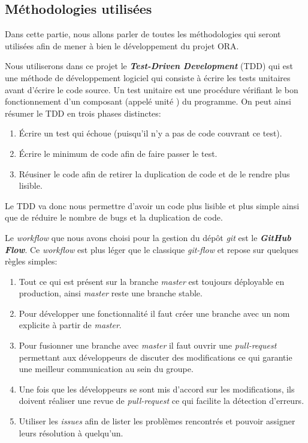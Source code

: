 \documentclass[11pt, a4paper]{specifications}
\begin{document}
    \subsection{Méthodologies utilisées}
Dans cette partie, nous allons parler de toutes les méthodologies qui seront utilisées afin de mener à bien le développement du projet ORA.\newline

Nous utiliserons dans ce projet le \textbf{\textit{Test-Driven Development}} (TDD) qui est une méthode de développement logiciel qui consiste à écrire les tests unitaires avant d'écrire le code source. Un test unitaire est une procédure vérifiant le bon fonctionnement d'un composant (appelé \og unité \fg) du programme.
On peut ainsi résumer le TDD en trois phases distinctes:
\begin{enumerate}
  \item Écrire un test qui échoue (puisqu'il n'y a pas de code couvrant ce test).
  \item Écrire le minimum de code afin de faire passer le test.
  \item Réusiner le code afin de retirer la duplication de code et de le rendre plus lisible.
\end{enumerate}
\bigbreak
Le TDD va donc nous permettre d'avoir un code plus lisible et plus simple ainsi que de réduire le nombre de bugs et la duplication de code.

Le \textit{workflow} que nous avons choisi pour la gestion du dépôt \textit{git} est le \textbf{\textit{GitHub Flow}}. Ce \textit{workflow} est plus léger que le classique \textit{git-flow} et repose sur quelques règles simples:
\begin{enumerate}
  \item Tout ce qui est présent sur la branche \textit{master} est toujours déployable en production, ainsi \textit{master} reste une branche stable.
  \item Pour développer une fonctionnalité il faut créer une branche avec un nom explicite à partir de \textit{master}.
  \item Pour fusionner une branche avec \textit{master} il faut ouvrir une \textit{pull-request} permettant aux développeurs de discuter des modifications ce qui garantie une meilleur communication au sein du groupe.
  \item Une fois que les développeurs se sont mis d'accord sur les modifications, ils doivent réaliser une revue de \textit{pull-request} ce qui facilite la détection d'erreurs.
  \item Utiliser les \textit{issues} afin de lister les problèmes rencontrés et pouvoir assigner leurs résolution à quelqu'un.
\end{enumerate}
\bigbreak
\end{document}
